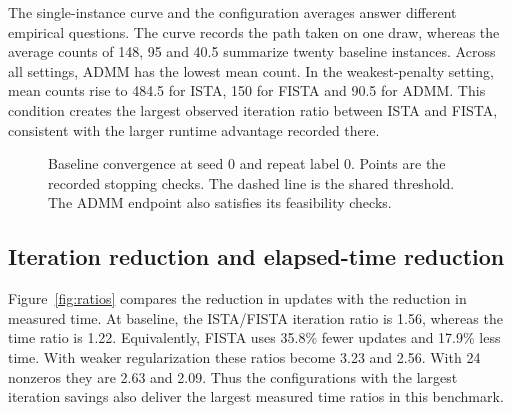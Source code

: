 \documentclass{article}
\begin{document}
The single-instance curve and the configuration averages answer different empirical questions. The curve records the path taken on one draw, whereas the average counts of 148, 95 and 40.5 summarize twenty baseline instances. Across all settings, ADMM has the lowest mean count. In the weakest-penalty setting, mean counts rise to 484.5 for ISTA, 150 for FISTA and 90.5 for ADMM. This condition creates the largest observed iteration ratio between ISTA and FISTA, consistent with the larger runtime advantage recorded there.

\begin{figure}[htbp]\centering
{}
\caption{Baseline convergence at seed 0 and repeat label 0. Points are the recorded stopping checks. The dashed line is the shared threshold. The ADMM endpoint also satisfies its feasibility checks.}\label{fig:trajectory}
\end{figure}

\subsection{Iteration reduction and elapsed-time reduction}
Figure~\ref{fig:ratios} compares the reduction in updates with the reduction in measured time. At baseline, the ISTA/FISTA iteration ratio is 1.56, whereas the time ratio is 1.22. Equivalently, FISTA uses 35.8\% fewer updates and 17.9\% less time. With weaker regularization these ratios become 3.23 and 2.56. With 24 nonzeros they are 2.63 and 2.09. Thus the configurations with the largest iteration savings also deliver the largest measured time ratios in this benchmark.
\end{document}
